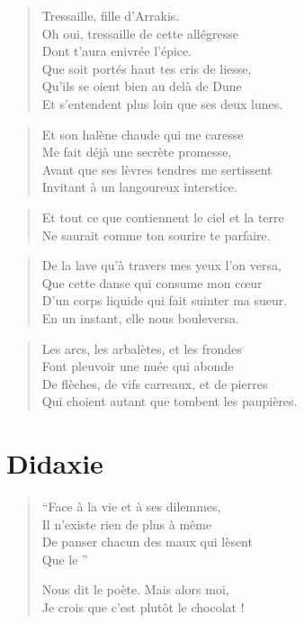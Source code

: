 \begin{verse}
Tressaille, fille d’Arrakis.\\
Oh oui, tressaille de cette allégresse\\
Dont t’aura enivrée l’épice.\\
Que soit portés haut tes cris de liesse,\\
Qu’ils se oient bien au delà de Dune\\
Et s’entendent plus loin que ses deux lunes.
\end{verse}

\begin{verse}
Et son halène chaude qui me caresse\\
Me fait déjà une secrète promesse,\\
Avant que ses lèvres tendres me sertissent\\
Invitant à un langoureux interstice.
\end{verse}

\begin{verse}
Et tout ce que contiennent le ciel et la terre\\
Ne saurait comme ton sourire te parfaire.
\end{verse}

\begin{verse}
De la lave qu’à travers mes yeux l’on versa,\\
Que cette danse qui consume mon cœur\\
D’un corps liquide qui fait suinter ma sueur.\\
En un instant, elle nous bouleversa.
\end{verse}

\begin{verse}
Les arcs, les arbalètes, et les frondes\\
Font pleuvoir une nuée qui abonde\\
De flèches, de vifs carreaux, et de pierres\\
Qui choient autant que tombent les paupières.
\end{verse}


\section*{Didaxie}

\begin{verse}
\enquote{Face à la vie et à ses dilemmes,\\
Il n’existe rien de plus à même\\
De panser chacun des maux qui lèsent\\
Que le }

Nous dit le poète. Mais alors moi,\\
Je crois que c’est plutôt le chocolat !
\end{verse}

